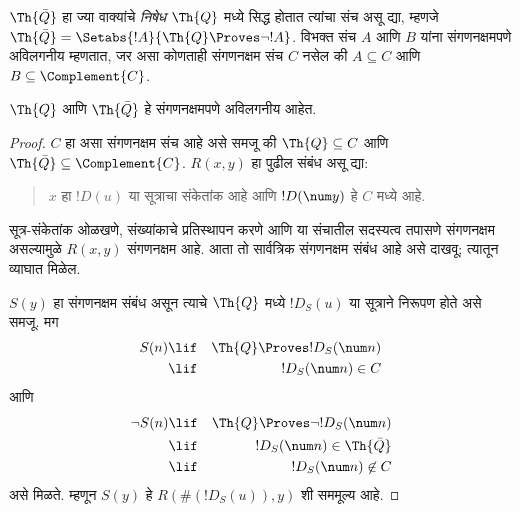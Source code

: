 \documentclass[../../../include/open-logic-section]{subfiles}
\begin{document}



$\Th{\bar Q}$ हा ज्या वाक्यांचे {\em निषेध} $\Th{Q}$ मध्ये
सिद्ध होतात त्यांचा संच असू द्या, म्हणजे
$\Th{\bar Q} = \Setabs{!A}{\Th{Q} \Proves
  \lnot !A}$. विभक्त संच $A$ आणि $B$ यांना
संगणनक्षमपणे अविलगनीय म्हणतात, जर असा कोणताही
संगणनक्षम संच $C$ नसेल की $A \subseteq C$ आणि
$B \subseteq \Complement{C}$.

\begin{lem}
$\Th{Q}$ आणि $\Th{\bar Q}$ हे संगणनक्षमपणे अविलगनीय आहेत.
\end{lem}

\begin{proof}
$C$ हा असा संगणनक्षम संच आहे असे समजू की
$\Th{Q} \subseteq C$ आणि
$\Th{\bar Q} \subseteq \Complement{C}$.
$R(x,y)$ हा पुढील संबंध असू द्या:
\begin{quote}
$x$ हा $!D(u)$ या सूत्राचा संकेतांक आहे आणि
$!D(\num y)$ हे $C$ मध्ये आहे.
\end{quote}
सूत्र-संकेतांक ओळखणे, संख्यांकाचे प्रतिस्थापन करणे आणि
या संचातील सदस्यत्व तपासणे संगणनक्षम असल्यामुळे $R(x,y)$
संगणनक्षम आहे. आता तो सार्वत्रिक संगणनक्षम संबंध आहे असे दाखवू;
त्यातून व्याघात मिळेल.

$S(y)$ हा संगणनक्षम संबंध असून त्याचे $\Th{Q}$ मध्ये
$!D_S(u)$ या सूत्राने निरूपण होते असे समजू. मग
\begin{eqnarray*}
S(n) & \lif & \Th{Q} \Proves !D_S(\num n) \\
& \lif & !D_S(\num n) \in C
\end{eqnarray*}
आणि
\begin{eqnarray*}
\lnot S(n) & \lif & \Th{Q} \Proves \lnot !D_S(\num n) \\
& \lif & !D_S(\num n) \in \Th{\bar Q} \\
& \lif & !D_S(\num n) \not\in C
\end{eqnarray*}
असे मिळते. म्हणून $S(y)$ हे
$R(\#(!D_S(u)),y)$ शी सममूल्य आहे.
\end{proof}
\end{document}
